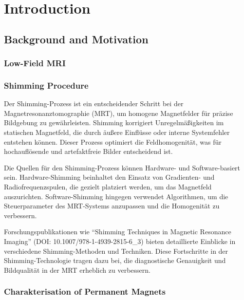 \hypertarget{introduction}{%
\chapter{Introduction}\label{introduction}}

\hypertarget{background-and-motivation}{%
\section{Background and Motivation}\label{background-and-motivation}}

\hypertarget{low-field-mri}{%
\subsection{Low-Field MRI}\label{low-field-mri}}

\hypertarget{shimming-procedure}{%
\subsection{Shimming Procedure}\label{shimming-procedure}}

Der Shimming-Prozess ist ein entscheidender Schritt bei der
Magnetresonanztomographie (MRT), um homogene Magnetfelder für präzise
Bildgebung zu gewährleisten. Shimming korrigiert Unregelmäßigkeiten im
statischen Magnetfeld, die durch äußere Einflüsse oder interne
Systemfehler entstehen können. Dieser Prozess optimiert die
Feldhomogenität, was für hochauflösende und artefaktfreie Bilder
entscheidend ist.

Die Quellen für den Shimming-Prozess können Hardware- und
Software-basiert sein. Hardware-Shimming beinhaltet den Einsatz von
Gradienten- und Radiofrequenzspulen, die gezielt platziert werden, um
das Magnetfeld auszurichten. Software-Shimming hingegen verwendet
Algorithmen, um die Steuerparameter des MRT-Systems anzupassen und die
Homogenität zu verbessern.

Forschungspublikationen wie ``Shimming Techniques in Magnetic Resonance
Imaging'' (DOI: 10.1007/978-1-4939-2815-6\_3) bieten detaillierte
Einblicke in verschiedene Shimming-Methoden und Techniken. Diese
Fortschritte in der Shimming-Technologie tragen dazu bei, die
diagnostische Genauigkeit und Bildqualität in der MRT erheblich zu
verbessern.

\hypertarget{charakterisation-of-permanent-magnets}{%
\subsection{Charakterisation of Permanent
Magnets}\label{charakterisation-of-permanent-magnets}}


